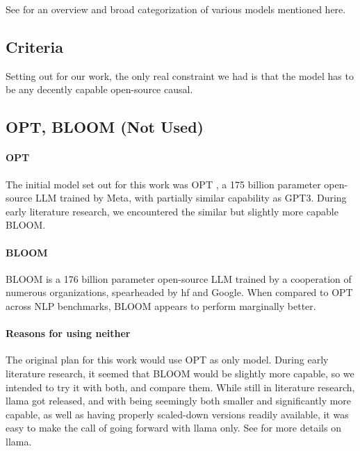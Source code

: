 See  for an overview and broad categorization of various models mentioned here.

\subsection{Criteria}\label{sub:criteria}
Setting out for our work, the only real constraint we had is that the model has to be any decently capable open-source \gls{causal}.

\subsection{OPT, BLOOM (Not Used)}\label{sub:opt}
\paragraph{OPT}\label{par:opt}
The initial model set out for this work was \gls{OPT} \cite{zhang_opt_2022}, a 175 billion parameter open-source \gls{LLM} trained by \gls{Meta}, with partially similar capability as \gls{GPT3}. During early literature research, we encountered the similar but slightly more capable \gls{BLOOM}.

\paragraph{BLOOM}\label{par:bloom}
\gls{BLOOM} \cite{workshop_bloom_2022} is a 176 billion parameter open-source \gls{LLM} trained by a cooperation of numerous organizations, spearheaded by \gls{hf} and \gls{Google}. When compared to \gls{OPT} across \gls{NLP} benchmarks, \gls{BLOOM} appears to perform marginally better.

\paragraph{Reasons for using neither}
The original plan for this work would use \gls{OPT} as only model. During early literature research, it seemed that \gls{BLOOM} would be slightly more capable, so we intended to try it with both, and compare them. 
While still in literature research, \gls{llama} got released, and with being seemingly both smaller and significantly more capable, as well as having properly scaled-down versions readily available, it was easy to make the call of going forward with \gls{llama} only. 
See  for more details on \gls{llama}.

